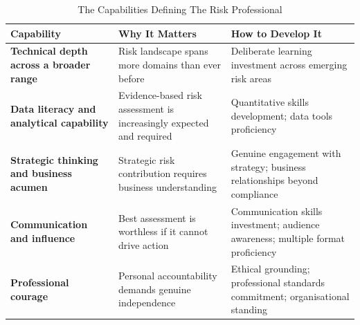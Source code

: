 \begin{table}[H]
  \centering
  \renewcommand{\arraystretch}{1.5}
  \begin{tabularx}{\textwidth}{ | >{\raggedright\arraybackslash}p{} 
								| >{\raggedright\arraybackslash}p{} 
                                | >{\raggedright\arraybackslash}X | }
    \hline
    \textbf{Capability} & \textbf{Why It Matters} & \textbf{How to Develop It} \\
    \hline
    \textbf{Technical depth across a broader range} & Risk landscape spans more domains than ever before & Deliberate learning investment across emerging risk areas\\
    \hline
    \textbf{Data literacy and analytical capability} & Evidence-based risk assessment is increasingly expected and required & Quantitative skills development; data tools proficiency\\
    \hline
    \textbf{Strategic thinking and business acumen} & Strategic risk contribution requires business understanding & Genuine engagement with strategy; business relationships beyond compliance\\
    \hline
    \textbf{Communication and influence} & Best assessment is worthless if it cannot drive action & Communication skills investment; audience awareness; multiple format proficiency\\
    \hline
    \textbf{Professional courage} & Personal accountability demands genuine independence & Ethical grounding; professional standards commitment; organisational standing\\
    \hline
  \end{tabularx}
  \caption{The Capabilities Defining The Risk Professional}
\end{table}

